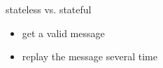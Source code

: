 \begin{frame}
  stateless vs. stateful
  \begin{itemize}
    \item get a valid message
    \item replay the message several time
  \end{itemize}
\end{frame}

\begin{frame}
\end{frame}

